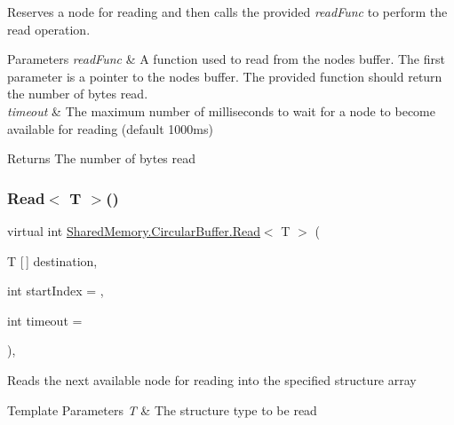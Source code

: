 Reserves a node for reading and then calls the provided {\itshape read\+Func}  to perform the read operation. 


\begin{DoxyParams}{Parameters}
{\em read\+Func} & A function used to read from the node\textquotesingle{}s buffer. The first parameter is a pointer to the node\textquotesingle{}s buffer. The provided function should return the number of bytes read.\\
\hline
{\em timeout} & The maximum number of milliseconds to wait for a node to become available for reading (default 1000ms)\\
\hline
\end{DoxyParams}
\begin{DoxyReturn}{Returns}
The number of bytes read
\end{DoxyReturn}
\mbox{\label{class_shared_memory_1_1_circular_buffer_ad58ea0beac997d6c4ad540f834fc54fb}} 
\subsubsection{\texorpdfstring{Read$<$ T $>$()}{Read< T >()}\hspace{0.1cm}{\footnotesize\ttfamily [1/2]}}
{\footnotesize\ttfamily virtual int \hyperlink{class_shared_memory_1_1_circular_buffer_a67667de3539376aee8411d68574764e1}{Shared\+Memory.\+Circular\+Buffer.\+Read}$<$ T $>$ (\begin{DoxyParamCaption}\item[{T \mbox{[}$\,$\mbox{]}}]{destination,  }\item[{int}]{start\+Index = {},  }\item[{int}]{timeout = {} }\end{DoxyParamCaption})\hspace{0.3cm}{\ttfamily [inline]}, {\ttfamily [virtual]}}



Reads the next available node for reading into the specified structure array 


\begin{DoxyTemplParams}{Template Parameters}
{\em T} & The structure type to be read\\
\hline
\end{DoxyTemplParams}

